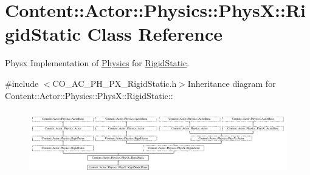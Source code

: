 \hypertarget{classContent_1_1Actor_1_1Physics_1_1PhysX_1_1RigidStatic}{
\section{Content::Actor::Physics::PhysX::RigidStatic Class Reference}
\label{classContent_1_1Actor_1_1Physics_1_1PhysX_1_1RigidStatic}
}


Physx Implementation of \hyperlink{namespaceContent_1_1Actor_1_1Physics}{Physics} for \hyperlink{classContent_1_1Actor_1_1Physics_1_1PhysX_1_1RigidStatic}{RigidStatic}.  


{\ttfamily \#include $<$CO\_\-AC\_\-PH\_\-PX\_\-RigidStatic.h$>$}Inheritance diagram for Content::Actor::Physics::PhysX::RigidStatic::\begin{figure}[H]
\begin{center}
\leavevmode
\includegraphics[height=2.89655cm]{classContent_1_1Actor_1_1Physics_1_1PhysX_1_1RigidStatic}
\end{center}
\end{figure}

